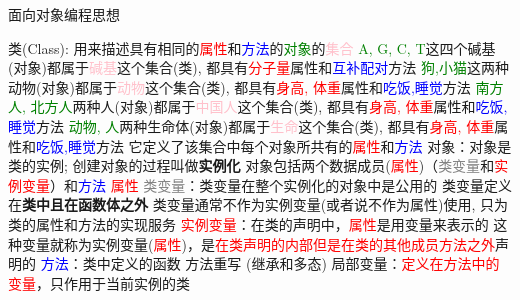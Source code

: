 \begin{frame}{面向对象编程思想}
    \small
    \begin{myoutline}
        \1 类(Class):
            \2 用来描述具有相同的\textcolor{red}{属性}和\textcolor{blue}{方法}的\textcolor{green}{对象}的\textcolor{pink}{集合}
                    \3 \textcolor{green}{A, G, C, T}这四个碱基(对象)都属于\textcolor{pink}{碱基}这个集合(类), 都具有\textcolor{red}{分子量}属性和\textcolor{blue}{互补配对}方法
                    \3 \textcolor{green}{狗,小猫}这两种动物(对象)都属于\textcolor{pink}{动物}这个集合(类), 都具有\textcolor{red}{身高, 体重}属性和\textcolor{blue}{吃饭,睡觉}方法
                    \3 \textcolor{green}{南方人,  北方人}两种人(对象)都属于\textcolor{pink}{中国人}这个集合(类), 都具有\textcolor{red}{身高, 体重}属性和\textcolor{blue}{吃饭,睡觉}方法
                    \3 \textcolor{green}{动物, 人}两种生命体(对象)都属于\textcolor{pink}{生命}这个集合(类), 都具有\textcolor{red}{身高, 体重}属性和\textcolor{blue}{吃饭,睡觉}方法
            \2 它定义了该集合中每个对象所共有的\textcolor{red}{属性}和\textcolor{blue}{方法}
        \1 对象：对象是类的实例; 创建对象的过程叫做\textbf{实例化}
            \2 对象包括两个数据成员(\textcolor{red}{属性})（\textcolor{gray}{类变量}和\textcolor{red}{实例变量}）和\textcolor{blue}{方法}
        \1 \textcolor{red}{属性}
            \2 \textcolor{gray}{类变量}：类变量在整个实例化的对象中是公用的
                \3 类变量定义在\textbf{类中且在函数体之外}
                \3 类变量通常不作为实例变量(或者说不作为属性)使用, 只为类的属性和方法的实现服务
            \2 \textcolor{red}{实例变量}：在类的声明中，\textcolor{red}{属性}是用变量来表示的
                \3 这种变量就称为实例变量(\textcolor{red}{属性})，是\textcolor{red}{在类声明的内部但是在类的其他成员方法之外}声明的
        \1 \textcolor{blue}{方法}：类中定义的函数
            \2 方法重写 (继承和多态)
            \2 局部变量：\textcolor{red}{定义在方法中的变量}，只作用于当前实例的类
    \end{myoutline}
\end{frame}
